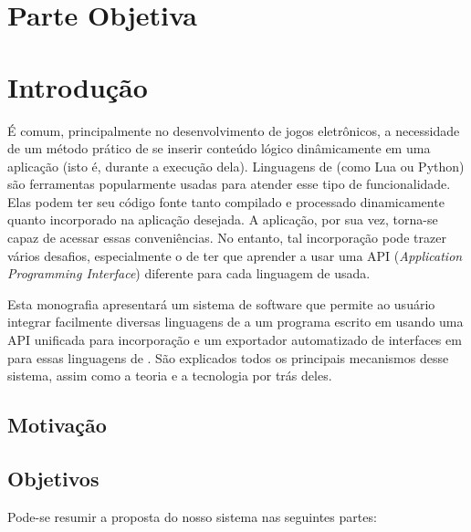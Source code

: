 \chapter*{Parte Objetiva}
\label{sec:parte_objetiva}
\chapter{Introdução}
\label{sec:intr}

É comum, principalmente no desenvolvimento de jogos eletrônicos, a necessidade
de um método prático de se inserir conteúdo lógico dinâmicamente em uma
aplicação (isto é, durante a execução dela). Linguagens de \script{} (como Lua ou
Python) são ferramentas popularmente usadas para atender esse tipo de
funcionalidade. Elas podem ter seu código fonte tanto compilado e processado
dinamicamente quanto incorporado na aplicação desejada. A aplicação, por sua
vez, torna-se capaz de acessar essas conveniências. No entanto, tal incorporação
pode trazer vários desafios, especialmente o de ter que aprender a usar uma API
(\textit{Application Programming Interface}) diferente para cada linguagem de
\script{} usada.

Esta monografia apresentará um sistema de software que permite ao usuário
integrar facilmente diversas linguagens de \script{} a um programa escrito em
\CXX{} usando uma API unificada para incorporação e um exportador
automatizado de interfaces em \CXX{} para essas linguagens de \script{}. São
explicados todos os principais mecanismos desse sistema, assim como a teoria e a
tecnologia por trás deles.

\section{Motivação}
\label{sec:intr:motivacao}

\section{Objetivos}
\label{sec:intr:objetivos}

Pode-se resumir a proposta do nosso sistema nas seguintes partes:

